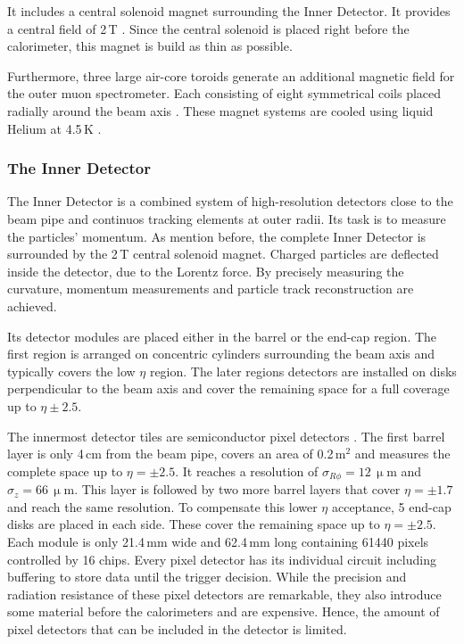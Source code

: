 \documentclass[bachelor,ngerman,english]{GAUBM}
\begin{document}
It includes a central solenoid magnet surrounding the Inner Detector. It provides a central field of 2\,T \cite{atlas:tech_design_report_01}. Since the central solenoid is placed right before the calorimeter, this magnet is build as thin as possible. 

Furthermore, three large air-core toroids generate an additional magnetic field for the outer muon spectrometer. Each consisting of eight symmetrical coils placed radially around the beam axis \cite{atlas:tech_design_report_01}. These magnet systems are cooled using liquid Helium at 4.5\,K \cite{atlas:tech_design_report_01}. 

\subsubsection*{The Inner Detector}
The Inner Detector \cite{atlas:tech_design_report_inner_01,atlas:tech_design_report_inner_02} is a combined system of high-resolution detectors close to the beam pipe and continuos tracking elements at outer radii. Its task is to measure the particles' momentum. As mention before, the complete Inner Detector is surrounded by the 2\,T central solenoid magnet. Charged particles are deflected inside the detector, due to the Lorentz force. By precisely measuring the curvature, momentum measurements and particle track reconstruction are achieved.

Its detector modules are placed either in the barrel or the end-cap region. The first region is arranged on concentric cylinders surrounding the beam axis and typically covers the low $\eta$ region. The later regions detectors are installed on disks perpendicular to the beam axis and cover the remaining space for a full coverage up to $\eta\pm2.5$.

The innermost detector tiles are semiconductor pixel detectors \cite{atlas:tech_design_report_01,atlas:pixel_detector}. The first barrel layer is only 4\,cm from the beam pipe, covers an area of 0.2\,m$^2$ and measures the complete space up to $\eta=\pm2.5$. It reaches a resolution of $\sigma_{R\phi}=12\,\upmu\text{m}$ and $\sigma_{z}=66\,\upmu\text{m}$. This layer is followed by two more barrel layers that cover $\eta=\pm1.7$ and reach the same resolution. To compensate this lower $\eta$ acceptance, 5 end-cap disks are placed in each side. These cover the remaining space up to $\eta=\pm2.5$. Each module is only 21.4\,mm wide and 62.4\,mm long containing 61440 pixels controlled by 16 chips. Every pixel detector has its individual circuit including buffering to store data until the trigger decision. While the precision and radiation resistance of these pixel detectors are remarkable, they also introduce some material before the calorimeters and are expensive. Hence, the amount of pixel detectors that can be included in the detector is limited. 
\end{document}
